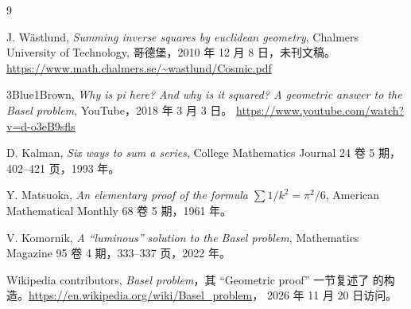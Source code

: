 {\footnotesize
\begin{thebibliography}{9}

J. Wästlund, \emph{Summing inverse squares by euclidean geometry},
Chalmers University of Technology, 哥德堡，2010 年 12 月 8 日，未刊文稿。
\url{https://www.math.chalmers.se/~wastlund/Cosmic.pdf}

3Blue1Brown, \emph{Why is pi here? And why is it squared? A geometric answer to the Basel problem},
YouTube，2018 年 3 月 3 日。
\url{https://www.youtube.com/watch?v=d-o3eB9sfls}

D. Kalman, \emph{Six ways to sum a series}, College Mathematics Journal 24 卷 5 期，402--421 页，1993 年。

Y. Matsuoka, \emph{An elementary proof of the formula $\sum 1/k^{2}=\pi^{2}/6$},
American Mathematical Monthly 68 卷 5 期，1961 年。

V. Komornik, \emph{A ``luminous'' solution to the Basel problem},
Mathematics Magazine 95 卷 4 期，333--337 页，2022 年。

{Wikipedia contributors}, \emph{Basel problem}，其 ``Geometric proof'' 一节复述了
\cite{wastlund} 的构造。\url{https://en.wikipedia.org/wiki/Basel_problem}，
2026 年 11 月 20 日访问。

\end{thebibliography}}
